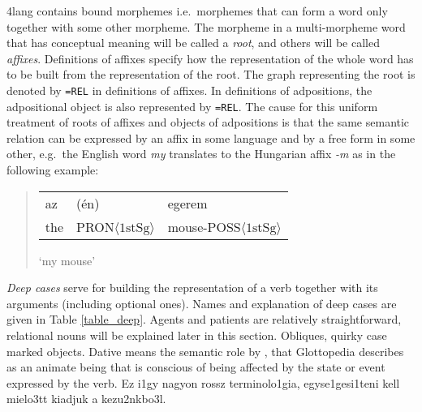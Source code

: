 \documentclass[a4paper,10pt]{article}
\begin{document}
4lang contains bound morphemes i.e.\ morphemes that can form a word only
together with some other morpheme. The morpheme in a multi-morpheme word that
has conceptual meaning will be called a \emph{root}, and others will be called
\emph{affixes}. Definitions of affixes specify how the representation of the whole
word has to be built from the representation of the root. The graph
representing the root is denoted by \texttt{=REL} in definitions of
affixes. In definitions of adpositions, the adpositional object is also represented by \texttt{=REL}. The cause for this uniform treatment of roots of affixes and objects of adpositions is that the same semantic relation can be
expressed by an affix in some language and by a free form in some other,
e.g.\ the English word \emph{my} translates to the Hungarian affix
\emph{-m} as in the following example:
\begin{quote}
\begin{tabular}{lll}
    az & (én) & egerem
\\ the & PRON$\langle\text{1stSg}\rangle$ & mouse-POSS$\langle \text{1stSg}\rangle$
\end{tabular} 

`my mouse'
\end{quote}

\emph{Deep cases} serve for building the representation of a verb together with its
arguments (including optional ones). Names and explanation of deep cases are
given in Table \ref{table_deep}.  Agents and patients are relatively
straightforward, relational nouns will be explained later in this
section. Obliques, quirky case marked objects. %
{{Dative means
    the semantic role by \cite{Fillmore:1968}, that Glottopedia describes as
    an animate being that is conscious of being affected by the state or event
    expressed by the verb.}}
 {\color{red} Ez i1gy nagyon rossz terminolo1gia, 
egyse1gesi1teni kell mielo3tt kiadjuk a kezu2nkbo3l.} 

% 
\end{document}
